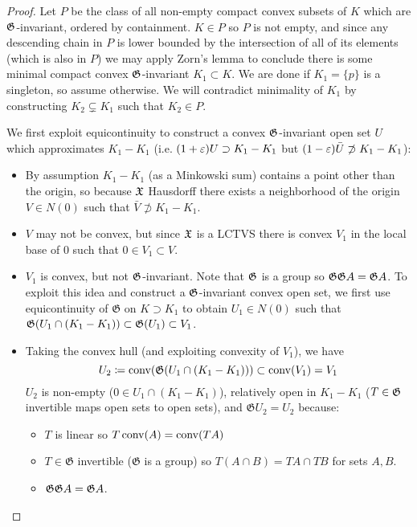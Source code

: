 \begin{proof}
  Let $P$ be the class of all non-empty compact convex subsets of $K$ which are
  $\mathfrak{G}$-invariant, ordered by containment.  $K \in P$ so $P$ is not empty, and
  since any descending chain in $P$ is lower bounded by the intersection of all
  of its elements (which is also in $P$) we may apply Zorn's lemma to conclude
  there is some minimal compact convex $\mathfrak{G}$-invariant $K_1 \subset K$.  We are
  done if $K_1 = \{p\}$ is a singleton, so assume otherwise.  We will
  contradict minimality of $K_1$ by constructing $K_2 \subsetneq K_1$ such that
  $K_2 \in P$.

  We first exploit equicontinuity to construct a convex $\mathfrak{G}$-invariant
  open set $U$ which approximates $K_1 - K_1$ (i.e.
  $(1+\varepsilon) U \supset K_1 - K_1$ but
  $(1 - \varepsilon) \bar{U} \not\supset K_1 - K_1$):
  \begin{itemize}
    \item
      By assumption $K_1 - K_1$ (as a Minkowski sum) contains a point other
      than the origin, so because $\mathfrak{X}$ Hausdorff there exists a neighborhood of
      the origin $V \in N(0)$ such that $\bar{V} \not\supset K_1 - K_1$.
    \item $V$ may not be convex, but since $\mathfrak{X}$ is a LCTVS there is
      convex $V_1$ in the local base of $0$ such that $0 \in V_1 \subset V$.
    \item $V_1$ is convex, but not $\mathfrak{G}$-invariant.
      Note that $\mathfrak{G}$ is a group so $\mathfrak{G} \mathfrak{G} A = \mathfrak{G} A$. To exploit this idea
      and construct a $\mathfrak{G}$-invariant convex open set,
      we first use equicontinuity of $\mathfrak{G}$ on $K \supset K_1$ to
      obtain $U_1 \in N(0)$ such that
      $\mathfrak{G}(U_1 \cap (K_1 - K_1)) \subset \mathfrak{G}(U_1) \subset V_1$.
    \item Taking the convex hull (and exploiting convexity of $V_1$),
      we have
      \[
        U_2
        \coloneqq \operatorname{conv}(\mathfrak{G}(U_1 \cap (K_1 - K_1)))
        \subset \operatorname{conv}(V_1)
        = V_1
      \]
      $U_2$ is non-empty ($0 \in U_1 \cap (K_1 - K_1)$),
      relatively open in $K_1 - K_1$
      ($T \in \mathfrak{G}$ invertible maps open sets to open sets),
      and $\mathfrak{G} U_2 = U_2$ because:
      \begin{itemize}
        \item $T$ is linear so $T \operatorname{conv}(A) = \operatorname{conv}(TA)$
        \item $T \in \mathfrak{G}$ invertible ($\mathfrak{G}$ is a group)
          so $T(A \cap B) = TA \cap TB$ for sets $A, B$.
        \item $\mathfrak{G} \mathfrak{G} A = \mathfrak{G} A$.

\end{itemize}
\end{itemize}
\end{proof}

